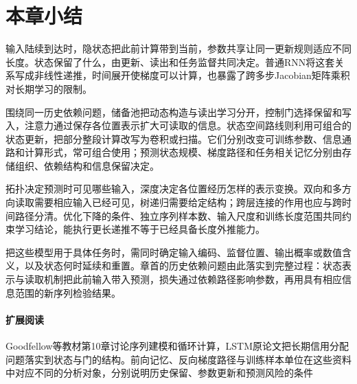 \Needspace{85mm}
\section{本章小结}
\label{sec:rnn-summary}

输入陆续到达时，隐状态把此前计算带到当前，参数共享让同一更新规则适应不同长度。状态保留了什么，由更新、读出和任务监督共同决定。普通RNN将这套关系写成非线性递推，时间展开使梯度可以计算，也暴露了跨多步Jacobian矩阵乘积对长期学习的限制。

围绕同一历史依赖问题，储备池把动态构造与读出学习分开，控制门选择保留和写入，注意力通过保存各位置表示扩大可读取的信息。状态空间路线则利用可组合的状态更新，把部分整段计算改写为卷积或扫描。它们分别改变可训练参数、信息通路和计算形式，常可组合使用；预测状态规模、梯度路径和任务相关记忆分别由存储组织、依赖结构和信息保留决定。

拓扑决定预测时可见哪些输入，深度决定各位置经历怎样的表示变换。双向和多方向读取需要相应输入已经可见，树递归需要给定结构；跨层连接的作用也应与跨时间路径分清。优化下降的条件、独立序列样本数、输入尺度和训练长度范围共同约束学习结论，能执行更长递推不等于已经具备长度外推能力。

把这些模型用于具体任务时，需同时确定输入编码、监督位置、输出概率或数值含义，以及状态何时延续和重置。章首的历史依赖问题由此落实到完整过程：状态表示与读取机制把此前输入带入预测，损失通过依赖路径影响参数，再用具有相应信息范围的新序列检验结果。

\paragraph{扩展阅读}
Goodfellow等教材第10章讨论序列建模和循环计算，LSTM原论文把长期信用分配问题落实到状态与门的结构。前向记忆、反向梯度路径与训练样本单位在这些资料中对应不同的分析对象，分别说明历史保留、参数更新和预测风险的条件

